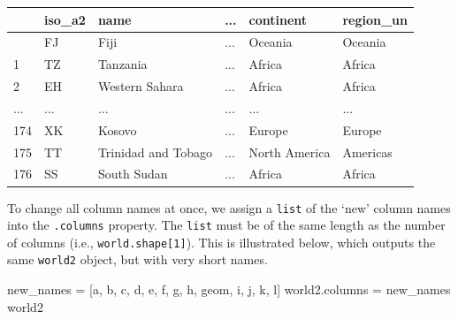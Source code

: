 \documentclass[
  letterpaper,
]{krantz}
\newenvironment{Shaded}{\begin{snugshade}}{\end{snugshade}}
\newcommand{\NormalTok}[1]{\textcolor[rgb]{0.00,0.23,0.31}{#1}}
\newcommand{\OperatorTok}[1]{\textcolor[rgb]{0.37,0.37,0.37}{#1}}
\newcommand{\StringTok}[1]{\textcolor[rgb]{0.13,0.47,0.30}{#1}}
\begin{document}
\begin{longtable}[]{@{}llllll@{}}
\toprule\noalign{}
& iso\_a2 & name & ... & continent & region\_un \\
\midrule\noalign{}
\endhead
\bottomrule\noalign{}
\endlastfoot
0 & FJ & Fiji & ... & Oceania & Oceania \\
1 & TZ & Tanzania & ... & Africa & Africa \\
2 & EH & Western Sahara & ... & Africa & Africa \\
... & ... & ... & ... & ... & ... \\
174 & XK & Kosovo & ... & Europe & Europe \\
175 & TT & Trinidad and Tobago & ... & North America & Americas \\
176 & SS & South Sudan & ... & Africa & Africa \\
\end{longtable}

To change all column names at once, we assign a \texttt{list} of the
`new' column names into the \texttt{.columns} property. The
\texttt{list} must be of the same length as the number of columns (i.e.,
\texttt{world.shape{[}1{]}}). This is illustrated below, which outputs
the same \texttt{world2} object, but with very short names.

\begin{Shaded}
\begin{Highlighting}[]
\NormalTok{new\_names }\OperatorTok{=}\NormalTok{ [}\StringTok{\textquotesingle{}a\textquotesingle{}}\NormalTok{, }\StringTok{\textquotesingle{}b\textquotesingle{}}\NormalTok{, }\StringTok{\textquotesingle{}c\textquotesingle{}}\NormalTok{, }\StringTok{\textquotesingle{}d\textquotesingle{}}\NormalTok{, }\StringTok{\textquotesingle{}e\textquotesingle{}}\NormalTok{, }\StringTok{\textquotesingle{}f\textquotesingle{}}\NormalTok{, }\StringTok{\textquotesingle{}g\textquotesingle{}}\NormalTok{, }\StringTok{\textquotesingle{}h\textquotesingle{}}\NormalTok{, }\StringTok{\textquotesingle{}geom\textquotesingle{}}\NormalTok{, }\StringTok{\textquotesingle{}i\textquotesingle{}}\NormalTok{, }\StringTok{\textquotesingle{}j\textquotesingle{}}\NormalTok{, }\StringTok{\textquotesingle{}k\textquotesingle{}}\NormalTok{, }\StringTok{\textquotesingle{}l\textquotesingle{}}\NormalTok{]}
\NormalTok{world2.columns }\OperatorTok{=}\NormalTok{ new\_names}
\NormalTok{world2}
\end{Highlighting}
\end{Shaded}
\end{document}
